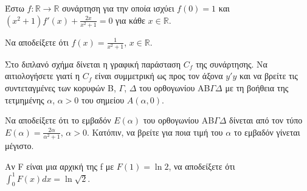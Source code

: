 Έστω $f: \mathbb{R} \to \mathbb{R}$ συνάρτηση για την οποία ισχύει $f(0)=1$ και $(x^2+1)f'(x)+\frac{2x}{x^2+1}=0$ για κάθε $x \in \mathbb{R}$.
\begin{alist}
    \item Να αποδείξετε ότι $f(x) = \frac{1}{x^2+1}$, $x \in \mathbb{R}$. 
    \item Στο διπλανό σχήμα δίνεται η γραφική παράσταση $C_f$ της συνάρτησης. Να αιτιολογήσετε γιατί η $C_f$ είναι συμμετρική ως προς τον άξονα $y'y$ και να βρείτε τις συντεταγμένες των κορυφών B, $\Gamma$, $\Delta$ του ορθογωνίου ΑΒ$\Gamma$$\Delta$ με τη βοήθεια της τετμημένης $\alpha$, $\alpha > 0$ του σημείου $A(\alpha, 0)$. 
    \item Να αποδείξετε ότι το εμβαδόν $E(\alpha)$ του ορθογωνίου ΑΒ$\Gamma$$\Delta$ δίνεται από τον τύπο $E(\alpha) = \frac{2\alpha}{\alpha^2+1}$, $\alpha > 0$. Κατόπιν, να βρείτε για ποια τιμή του $\alpha$ το εμβαδόν γίνεται μέγιστο. 
    \item Αν F είναι μια αρχική της f με $F(1)=\ln 2$, να αποδείξετε ότι $\int_0^1 F(x)dx = \ln \sqrt{2}$. 
\end{alist}